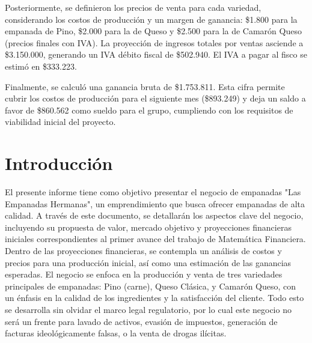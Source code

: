 \documentclass[12pt]{article}
\begin{document}
Posteriormente, se definieron los precios de venta para cada variedad, considerando los costos de producción y un margen de ganancia: \$1.800 para la empanada de Pino, \$2.000 para la de Queso y \$2.500 para la de Camarón Queso (precios finales con IVA). La proyección de ingresos totales por ventas asciende a \$3.150.000, generando un IVA débito fiscal de \$502.940. El IVA a pagar al fisco se estimó en \$333.223.

Finalmente, se calculó una ganancia bruta de \$1.753.811. Esta cifra permite cubrir los costos de producción para el siguiente mes (\$893.249) y deja un saldo a favor de \$860.562 como sueldo para el grupo, cumpliendo con los requisitos de viabilidad inicial del proyecto.
\newpage



\section{Introducción} %
El presente informe tiene como objetivo presentar el negocio de empanadas "Las Empanadas Hermanas", un emprendimiento que busca ofrecer empanadas de alta calidad. A través de este documento, se detallarán los aspectos clave del negocio, incluyendo su propuesta de valor, mercado objetivo y proyecciones financieras iniciales correspondientes al primer avance del trabajo de Matemática Financiera. \\

Dentro de las proyecciones financieras, se contempla un análisis de costos y precios para una producción inicial, así como una estimación de las ganancias esperadas. El negocio se enfoca en la producción y venta de tres variedades principales de empanadas: Pino (carne), Queso Clásica, y Camarón Queso, con un énfasis en la calidad de los ingredientes y la satisfacción del cliente. Todo esto se desarrolla sin olvidar el marco legal regulatorio, por lo cual este negocio no será un frente para lavado de activos, evasión de impuestos, generación de facturas ideológicamente falsas, o la venta de drogas ilícitas. \\ %
\end{document}
